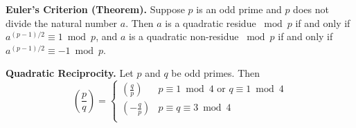 \documentclass[12pt]{amsart}
\theoremstyle{plain}
\theoremstyle{definition}
\theoremstyle{remark}
\begin{document}
\noindent \textbf{Euler's Criterion (Theorem).}
Suppose $p$ is an odd prime and $p$ does not divide the natural number $a$.  Then $a$ is a quadratic residue $\bmod p$ if and only if $a^{(p-1)/2} \equiv 1 \bmod p$, and $a$ is a quadratic non-residue $\bmod p$ if and only if $a^{(p-1)/2} \equiv -1 \bmod p$.


\noindent \textbf{Quadratic Reciprocity.}
Let $p$ and $q$ be odd primes.  Then
\[ \left( \frac{p}{q}\right) = \begin{cases} 
      \left( \frac{q}{p}\right) & p \equiv 1 \bmod 4 \text{ or } q \equiv 1 \bmod 4\\
      \left( -\frac{q}{p}\right) & p \equiv q \equiv 3 \bmod 4\\
   \end{cases}
\]
\end{document}
